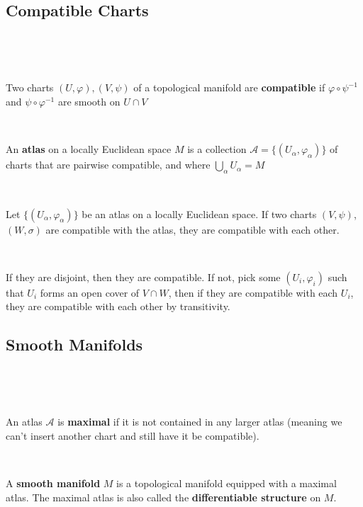 \documentclass{article}
\begin{document}
\subsection{Compatible Charts}
\

\begin{definition}
  \

  Two charts $(U, \varphi), (V, \psi)$ of a topological manifold are \textbf{compatible} if $\varphi \circ \psi ^{-1}$ and $\psi \circ \varphi ^{-1}$ are smooth on $U \cap V$
\end{definition}

\begin{definition}[Atlas]
  \

  An \textbf{atlas} on a locally Euclidean space $M$ is a collection $\mathcal{A} = \{(U_\alpha, \varphi_\alpha)\}$ of charts that are pairwise compatible, and where $\bigcup_\alpha U_\alpha = M$
\end{definition}

\begin{proposition}
  \

  Let $\{(U_\alpha, \varphi_\alpha)\}$ be an atlas on a locally Euclidean space. If two charts $(V, \psi)$, $(W, \sigma)$ are compatible with the atlas, they are compatible with each other.
\end{proposition}

\begin{customproof}
  \

  If they are disjoint, then they are compatible. If not, pick some $(U_i, \varphi_i)$ such that $U_i$ forms an open cover of $V \cap W$, then if they are compatible with each $U_i$, they are compatible with each other by transitivity.
\end{customproof}

\subsection{Smooth Manifolds}
\

\begin{definition}
  \

  An atlas $\mathcal{A}$ is \textbf{maximal} if it is not contained in any larger atlas (meaning we can't insert another chart and still have it be compatible).
\end{definition}

\begin{definition}
  \

  A \textbf{smooth manifold} $M$ is a topological manifold equipped with a maximal atlas. The maximal atlas is also called the \textbf{differentiable structure} on $M$.
\end{definition}
\end{document}
